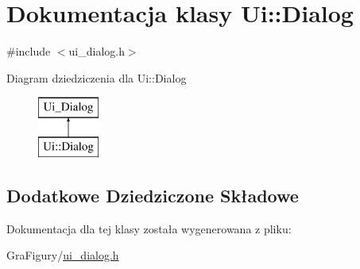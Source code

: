 \hypertarget{classUi_1_1Dialog}{\section{Dokumentacja klasy Ui\-:\-:Dialog}
\label{classUi_1_1Dialog}
}


{\ttfamily \#include $<$ui\-\_\-dialog.\-h$>$}

Diagram dziedziczenia dla Ui\-:\-:Dialog\begin{figure}[H]
\begin{center}
\leavevmode
\includegraphics[height=2.000000cm]{classUi_1_1Dialog}
\end{center}
\end{figure}
\subsection*{Dodatkowe Dziedziczone Składowe}


Dokumentacja dla tej klasy została wygenerowana z pliku\-:\begin{DoxyCompactItemize}
\item 
Gra\-Figury/\hyperlink{ui__dialog_8h}{ui\-\_\-dialog.\-h}\end{DoxyCompactItemize}

